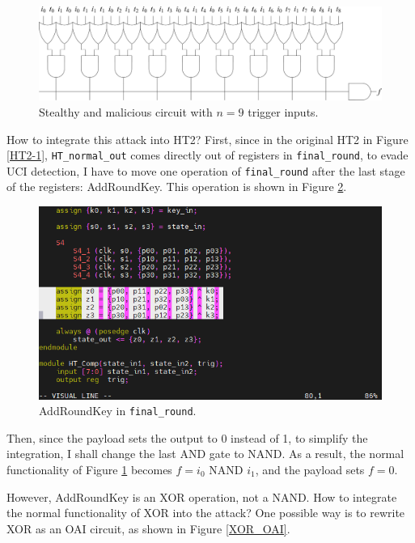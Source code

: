 \documentclass{article}
\begin{document}
\begin{figure}[htp] \centering
\includegraphics[width=\textwidth]{Product of sums attack}
\caption{Stealthy and malicious circuit with $n=9$ trigger inputs.}
\label{Product of sums attack}
\end{figure}

How to integrate this attack into HT2? First, since in the original HT2 in Figure \ref{HT2-1}, \verb|HT_normal_out| comes directly out of registers in \verb|final_round|, to evade UCI detection, I have to move one operation of \verb|final_round| after the last stage of the registers: AddRoundKey. This operation is shown in Figure \ref{AddRoundKey}.

\begin{figure}[htp] \centering
\includegraphics[width=\textwidth]{AddRoundKey}
\caption{AddRoundKey in \texttt{final\_round}.}
\label{AddRoundKey}
\end{figure}

Then, since the payload sets the output to 0 instead of 1, to simplify the integration, I shall change the last AND gate to NAND. As a result, the normal functionality of Figure \ref{Product of sums attack} becomes $f=i_0\text{ NAND }i_1$, and the payload sets $f=0$.

However, AddRoundKey is an XOR operation, not a NAND. How to integrate the normal functionality of XOR into the attack? One possible way is to rewrite XOR as an OAI circuit, as shown in Figure \ref{XOR_OAI}.
\end{document}
